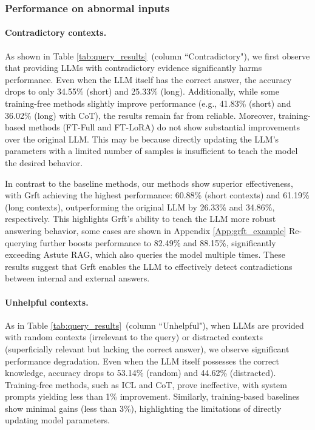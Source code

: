 \subsubsection{Performance on abnormal inputs}

 
\paragraph{Contradictory contexts.} As shown in Table \ref{tab:query_results}~(column ``Contradictory"), we first observe that providing LLMs with contradictory evidence significantly harms performance. Even when the LLM itself has the correct answer, the accuracy drops to only 34.55\% (short) and 25.33\% (long). Additionally, while some training-free methods slightly improve performance (e.g., 41.83\% (short) and 36.02\% (long) with CoT), the results remain far from reliable. Moreover, training-based methods (FT-Full and FT-LoRA) do not show substantial improvements over the original LLM. This may be because directly updating the LLM's parameters with a limited number of samples is insufficient to teach the model the desired behavior. 

In contrast to the baseline methods, our methods show superior effectiveness, with Grft achieving the highest performance: 60.88\% (short contexts) and 61.19\% (long contexts), outperforming the original LLM by 26.33\% and 34.86\%, respectively. This highlights Grft's ability to teach the LLM more robust answering behavior, some cases are shown in Appendix \ref{App:grft_example}
 Re-querying further boosts performance to 82.49\% and 88.15\%, significantly exceeding Astute RAG, which also queries the model multiple times. These results suggest that Grft enables the LLM to effectively detect contradictions between internal and external answers.

\paragraph{Unhelpful contexts.} As in Table \ref{tab:query_results}~(column ``Unhelpful"), when LLMs are provided with random contexts (irrelevant to the query) or distracted contexts (superficially relevant but lacking the correct answer), we observe significant performance degradation. Even when the LLM itself possesses the correct knowledge, accuracy drops to 53.14\% (random) and 44.62\% (distracted). Training-free methods, such as ICL and CoT, prove ineffective, with system prompts yielding less than 1\% improvement. Similarly, training-based baselines show minimal gains (less than 3\%), highlighting the limitations of directly updating model parameters. 


